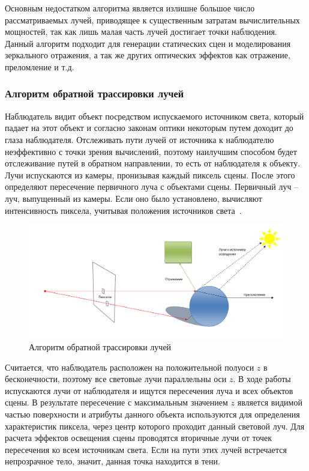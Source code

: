 Основным недостатком алгоритма является излишне большое число рассматриваемых лучей, приводящее к существенным затратам вычислительных мощностей, так как лишь малая часть лучей достигает точки наблюдения.
Данный алгоритм подходит для генерации статических сцен и моделирования зеркального отражения, а так же других оптических эффектов как отражение, преломление и т.д.

\subsubsection{Алгоритм обратной трассировки лучей}

Наблюдатель видит объект посредством испускаемого источником света,
который падает на этот объект и согласно законам оптики некоторым путем доходит до глаза наблюдателя. Отслеживать пути лучей от источника к наблюдателю неэффективно с точки зрения вычислений, поэтому наилучшим способом будет отслеживание путей в обратном направлении, то есть от наблюдателя к объекту. 
Лучи испускаются из камеры, пронизывая каждый пиксель сцены. 
После этого определяют пересечение первичного луча с объектами сцены. 
Первичный луч – луч, выпущенный из камеры. 
Если оно было установлено, вычисляют интенсивность пиксела, учитывая положения источников света~\cite{roders, ray-tracing}.

\begin{figure}[h]
	\centering
	\includegraphics[height=0.25\textheight]{img/reverse-ray-tracing.png}
	\caption{Алгоритм обратной трассировки лучей}
	\label{img:rray-tracing}
\end{figure}

Считается, что наблюдатель расположен на положительной полуоси $z$ в бесконечности, поэтому все световые лучи параллельны оси $z$. 
В ходе работы испускаются лучи от наблюдателя и ищутся пересечения луча и всех объектов сцены. 
В результате пересечение с максимальным значением $z$ является видимой частью поверхности и атрибуты данного объекта используются для определения характеристик пиксела, через центр которого проходит данный
световой луч.
Для расчета эффектов освещения сцены проводятся вторичные лучи от точек пересечения ко всем источникам света. Если на пути этих лучей встречается непрозрачное тело, значит, данная точка находится в тени.

